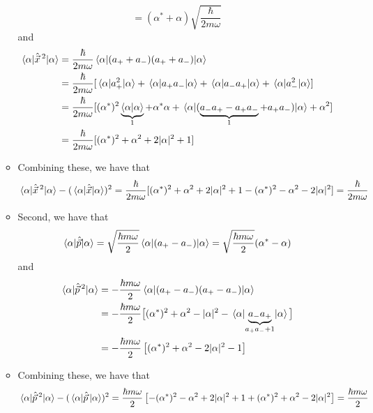 \documentclass[../notes.tex]{subfiles}
\begin{document}
\begin{itemize}
\begin{itemize}
\begin{equation*}
            = (\alpha^*+\alpha)\sqrt{\frac{\hbar}{2m\omega}}
        \end{equation*}
        and
        \begin{align*}
            \ev{\hat{\vec{x}}{\,}^2}{\alpha} &= \frac{\hbar}{2m\omega}\ev{(a_++a_-)(a_++a_-)}{\alpha}\\
            &= \frac{\hbar}{2m\omega}[\ev{a_+^2}{\alpha}+\ev{a_+a_-}{\alpha}+\ev{a_-a_+}{\alpha}+\ev{a_-^2}{\alpha}]\\
            &= \frac{\hbar}{2m\omega}[(\alpha^*)^2\underbrace{\braket{\alpha}}_1+\alpha^*\alpha+\ev{(\underbrace{a_-a_+-a_+a_-}_1+a_+a_-)}{\alpha}+\alpha^2]\\
            &= \frac{\hbar}{2m\omega}[(\alpha^*)^2+\alpha^2+2|\alpha|^2+1]
        \end{align*}
        \item Combining these, we have that
        \begin{equation*}
            \ev{\hat{\vec{x}}{\,}^2}{\alpha}-(\ev{\hat{\vec{x}}}{\alpha})^2 = \frac{\hbar}{2m\omega}[(\alpha^*)^2+\alpha^2+2|\alpha|^2+1-(\alpha^*)^2-\alpha^2-2|\alpha|^2]
            = \frac{\hbar}{2m\omega}
        \end{equation*}
        \item Second, we have that
        \begin{equation*}
            \ev{\hat{\vec{p}}}{\alpha} = \sqrt{\frac{\hbar m\omega}{2}}\ev{(a_+-a_-)}{\alpha}
            = \sqrt{\frac{\hbar m\omega}{2}}(\alpha^*-\alpha)
        \end{equation*}
        and
        \begin{align*}
            \ev{\hat{\vec{p}}{\,}^2}{\alpha} &= -\frac{\hbar m\omega}{2}\ev{(a_+-a_-)(a_+-a_-)}{\alpha}\\
            &= -\frac{\hbar m\omega}{2}\big[ (\alpha^*)^2+\alpha^2-|\alpha|^2-\ev{\underbrace{a_-a_+}_{a_+a_-+1}}{\alpha} \big]\\
            &= -\frac{\hbar m\omega}{2}\left[ (\alpha^*)^2+\alpha^2-2|\alpha|^2-1 \right]
        \end{align*}
        \item Combining these, we have that
        \begin{equation*}
            \ev{\hat{\vec{p}}{\,}^2}{\alpha}-(\ev{\hat{\vec{p}}\,}{\alpha})^2 = \frac{\hbar m\omega}{2}\left[ -(\alpha^*)^2-\alpha^2+2|\alpha|^2+1+(\alpha^*)^2+\alpha^2-2|\alpha|^2 \right]
            = \frac{\hbar m\omega}{2}
        \end{equation*}

\end{itemize}
\end{itemize}
\end{document}
